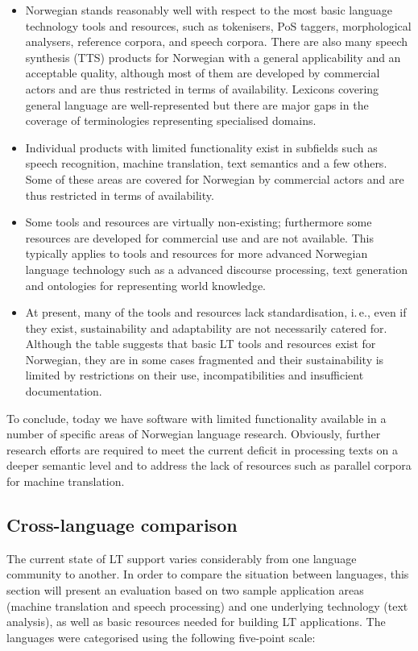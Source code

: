 \begin{multicols}{2}
\begin{itemize}
\item Norwegian stands reasonably well with respect to the most basic language technology tools and resources, such as tokenisers, PoS taggers, morphological analysers, reference corpora, and speech corpora. 
There are also many speech synthesis (TTS) products for Norwegian with a general applicability and an acceptable quality, although most of them are developed by commercial actors and are thus restricted in terms of availability. Lexicons covering general language are well-represented but there are major gaps in the coverage of terminologies representing specialised domains.
\item Individual products with limited functionality exist in subfields such as speech recognition, machine translation, text semantics and a few others. 
Some of these areas are covered for Norwegian by commercial actors and are thus restricted in terms of availability.
\item Some tools and resources are virtually non-existing; furthermore some resources are developed for commercial use and are not available. 
This typically applies to tools and resources for more advanced Norwegian language technology such as a advanced discourse processing, text generation and ontologies for representing world knowledge.
\item At present, many of the tools and resources lack standardisation, i.\,e., even if they exist, sustainability and adaptability are not necessarily catered for. 
Although the table suggests that basic LT tools and resources exist for Norwegian, they are in some cases fragmented and their sustainability is limited by restrictions on their use, incompatibilities and insufficient documentation. 
\end{itemize}

To conclude, today we have software with limited functionality available in a number of specific areas of Norwegian language research. 
Obviously, further research efforts are required to meet the current deficit in processing texts on a deeper semantic level and to address the lack of resources such as parallel corpora for machine translation.

\subsection{Cross-language comparison}

The current state of LT support varies considerably from one language community to another. In order to compare the situation between languages, this section will present an evaluation based on two sample application areas (machine translation and speech processing) and one underlying technology (text analysis), as well as basic resources needed for building LT applications. The languages were categorised using the following five-point scale: 


\end{multicols}
